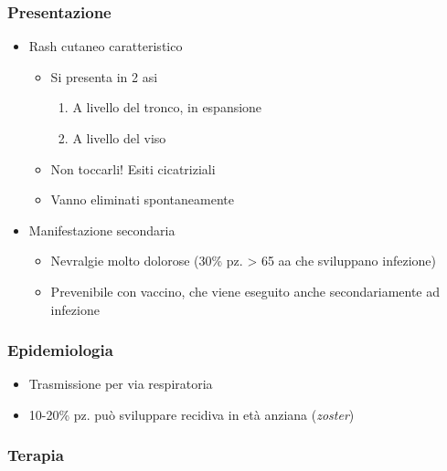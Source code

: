 \documentclass[italian,]{article}
\providecommand{\tightlist}{%
  \setlength{\itemsep}{0pt}\setlength{\parskip}{0pt}}
\begin{document}
\hypertarget{presentazione-1}{%
\subsubsection{Presentazione}\label{presentazione-1}}

\begin{itemize}
\tightlist
\item
  Rash cutaneo caratteristico

  \begin{itemize}
  \tightlist
  \item
    Si presenta in 2 asi

    \begin{enumerate}
    \def\labelenumi{\arabic{enumi}.}
    \tightlist
    \item
      A livello del tronco, in espansione
    \item
      A livello del viso
    \end{enumerate}
  \item
    Non toccarli! Esiti cicatriziali
  \item
    Vanno eliminati spontaneamente
  \end{itemize}
\item
  Manifestazione secondaria

  \begin{itemize}
  \tightlist
  \item
    Nevralgie molto dolorose (30\% pz. \textgreater{} 65 aa che
    sviluppano infezione)
  \item
    Prevenibile con vaccino, che viene eseguito anche secondariamente ad
    infezione
  \end{itemize}
\end{itemize}

\hypertarget{epidemiologia-7}{%
\subsubsection{Epidemiologia}\label{epidemiologia-7}}

\begin{itemize}
\tightlist
\item
  Trasmissione per via respiratoria
\item
  10-20\% pz. può sviluppare recidiva in età anziana (\emph{zoster})
\end{itemize}

\hypertarget{terapia-7}{%
\subsubsection{Terapia}\label{terapia-7}}
\end{document}
